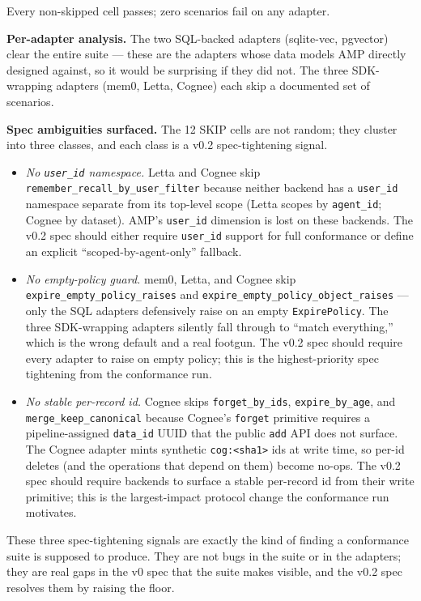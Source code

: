 \documentclass[11pt,letterpaper,twocolumn]{article}
\begin{document}
Every non-skipped cell passes; zero scenarios fail on any adapter.

\textbf{Per-adapter analysis.} The two SQL-backed adapters (sqlite-vec, pgvector) clear the entire suite --- these are the adapters whose data models AMP directly designed against, so it would be surprising if they did not. The three SDK-wrapping adapters (mem0, Letta, Cognee) each skip a documented set of scenarios.

\textbf{Spec ambiguities surfaced.} The 12 SKIP cells are not random; they cluster into three classes, and each class is a v0.2 spec-tightening signal.

\begin{itemize}[leftmargin=*]
  \item \emph{No \texttt{user\_id} namespace.} Letta and Cognee skip \texttt{remember\_recall\_by\_user\_filter} because neither backend has a \texttt{user\_id} namespace separate from its top-level scope (Letta scopes by \texttt{agent\_id}; Cognee by dataset). AMP's \texttt{user\_id} dimension is lost on these backends. The v0.2 spec should either require \texttt{user\_id} support for full conformance or define an explicit ``scoped-by-agent-only'' fallback.
  \item \emph{No empty-policy guard.} mem0, Letta, and Cognee skip \texttt{expire\_empty\_policy\_raises} and \texttt{expire\_empty\_policy\_object\_raises} --- only the SQL adapters defensively raise on an empty \texttt{ExpirePolicy}. The three SDK-wrapping adapters silently fall through to ``match everything,'' which is the wrong default and a real footgun. The v0.2 spec should require every adapter to raise on empty policy; this is the highest-priority spec tightening from the conformance run.
  \item \emph{No stable per-record id.} Cognee skips \texttt{forget\_by\_ids}, \texttt{expire\_by\_age}, and \texttt{merge\_keep\_canonical} because Cognee's \texttt{forget} primitive requires a pipeline-assigned \texttt{data\_id} UUID that the public \texttt{add} API does not surface. The Cognee adapter mints synthetic \texttt{cog:<sha1>} ids at write time, so per-id deletes (and the operations that depend on them) become no-ops. The v0.2 spec should require backends to surface a stable per-record id from their write primitive; this is the largest-impact protocol change the conformance run motivates.
\end{itemize}

These three spec-tightening signals are exactly the kind of finding a conformance suite is supposed to produce. They are not bugs in the suite or in the adapters; they are real gaps in the v0 spec that the suite makes visible, and the v0.2 spec resolves them by raising the floor.
\end{document}
